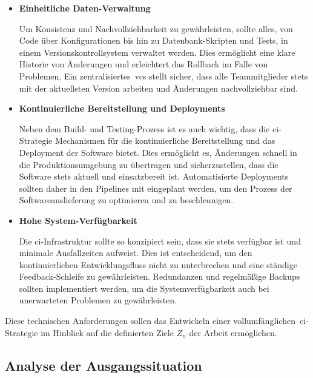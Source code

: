 \begin{itemize}
    \item {
        \textbf{Einheitliche Daten-Verwaltung}\par
        Um Konsistenz und Nachvollziehbarkeit zu gewährleisten, sollte alles, von Code über Konfigurationen bis hin
        zu Datenbank-Skripten und Tests, in einem Versionskontrollsystem verwaltet werden.
        Dies ermöglicht eine klare Historie von Änderungen und erleichtert das Rollback im Falle von Problemen.
        Ein zentralisiertes\ \acrshort{vcs} stellt sicher, dass alle Teammitglieder stets mit der aktuellsten Version
        arbeiten und Änderungen nachvollziehbar sind.
    }

    \item {
        \textbf{Kontinuierliche Bereitstellung und Deployments}\par
        Neben dem Build- und Testing-Prozess ist es auch wichtig, dass die \acrshort{ci}-Strategie Mechanismen für die
        kontinuierliche Bereitstellung und das Deployment der Software bietet.
        Dies ermöglicht es, Änderungen schnell in die Produktionsumgebung zu übertragen und sicherzustellen, dass die
        Software stets aktuell und einsatzbereit ist.
        Automatisierte Deployments sollten daher in den Pipelines mit eingeplant werden, um den Prozess der
        Softwareauslieferung zu optimieren und zu beschleunigen.
    }

    \item {
        \textbf{Hohe System-Verfügbarkeit}\par
        Die \acrshort{ci}-Infrastruktur sollte so konzipiert sein, dass sie stets verfügbar ist und minimale Ausfallzeiten
        aufweist. Dies ist entscheidend, um den kontinuierlichen Entwicklungsfluss nicht zu unterbrechen und eine
        ständige Feedback-Schleife zu gewährleisten.
        Redundanzen und regelmäßige Backups sollten implementiert werden, um die Systemverfügbarkeit auch bei
        unerwarteten Problemen zu gewährleisten.
    }
\end{itemize}

Diese technischen Anforderungen sollen das Entwickeln einer vollumfänglichen\ \acrshort{ci}-Strategie im Hinblick auf
die definierten Ziele $Z_n$ der Arbeit ermöglichen.

\subsection{Analyse der Ausgangssituation} \label{subsec:03-concept-2}

